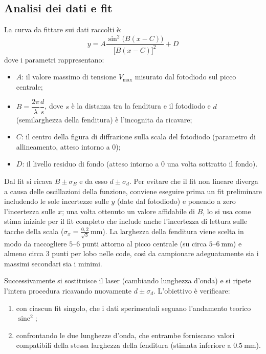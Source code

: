 \documentclass[openany,a4paper,12pt]{book}
\begin{document}
\subsection*{Analisi dei dati e fit}

La curva da fittare sui dati raccolti è:
\begin{equation*}
    y = A \frac{\sin^2\bigl(B(x - C)\bigr)}{\bigl[B(x - C)\bigr]^2} + D
\end{equation*}
dove i parametri rappresentano:
\begin{itemize}
    \item $A$: il valore massimo di tensione $V_{\max}$ misurato dal fotodiodo sul picco centrale;
    \item $B = \dfrac{2\pi}{\lambda} \dfrac{d}{s}$, dove $s$ è la distanza tra la fenditura e il fotodiodo e $d$ (semilarghezza della fenditura) è l'incognita da ricavare;
    \item $C$: il centro della figura di diffrazione sulla scala del fotodiodo (parametro di allineamento, atteso intorno a $0$);
    \item $D$: il livello residuo di fondo (atteso intorno a $0$ una volta sottratto il fondo).
\end{itemize}

Dal fit si ricava $B \pm \sigma_B$ e da esso $d \pm \sigma_d$. Per evitare che il fit non lineare diverga a causa delle oscillazioni della funzione, conviene eseguire prima un fit preliminare includendo le sole incertezze sulle $y$ (date dal fotodiodo) e ponendo a zero l'incertezza sulle $x$; una volta ottenuto un valore affidabile di $B$, lo si usa come stima iniziale per il fit completo che include anche l'incertezza di lettura sulle tacche della scala ($\sigma_x = \frac{0{,}2}{\sqrt{3}}\,\si{\milli\meter}$).
La larghezza della fenditura viene scelta in modo da raccogliere $5\text{--}6$ punti attorno al picco centrale (su circa $5\text{--}\SI{6}{\milli\meter}$) e almeno circa $3$ punti per lobo nelle code, così da campionare adeguatamente sia i massimi secondari sia i minimi.

Successivamente si sostituisce il laser (cambiando lunghezza d'onda) e si ripete l'intera procedura ricavando nuovamente $d \pm \sigma_d$. L'obiettivo è verificare:
\begin{enumerate}
    \item con ciascun fit singolo, che i dati sperimentali seguano l'andamento teorico $\operatorname{sinc}^2$;
    \item confrontando le due lunghezze d'onda, che entrambe forniscano valori compatibili della stessa larghezza della fenditura (stimata inferiore a $\SI{0.5}{\milli\meter}$).
\end{enumerate}
\end{document}
